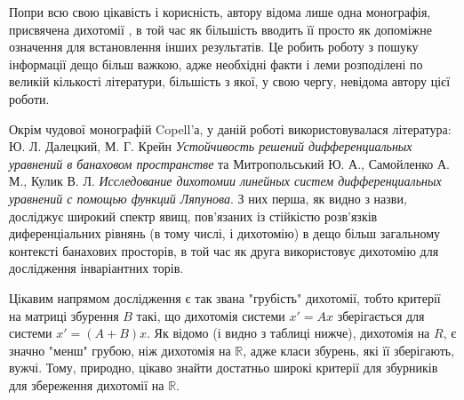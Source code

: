 \documentclass[14pt]{extarticle} %
\theoremstyle{remark}
\begin{document}
Попри всю свою цікавість і корисність, автору відома лише одна монографія, присвячена дихотомії \cite{coppel}, в той час як
більшість вводить її просто як допоміжне
означення для встановлення інших результатів. Це робить роботу з пошуку інформації дещо більш важкою, адже необхідні факти і леми
розподілені по великій кількості літератури, більшість з якої, у свою чергу, невідома автору цієї роботи.

Окрім чудової монографій Copell'а, у
даній роботі використовувалася література: Ю. Л. Далецкий, М. Г. Крейн
\emph{Устойчивость решений дифференциальных уравнений в банаховом пространстве} та Митропольський Ю. А., Самойленко А. М., Кулик В. Л.
\emph{Исследование дихотомии линейных систем дифференциальных уравнений с помощью функций Ляпунова}. З них перша, як видно з назви,
досліджує широкий спектр явищ, пов’язаних із стійкістю розв’язків диференціальних рівнянь (в тому числі, і дихотомію) в дещо
більш загальному контексті банахових просторів, в той час як друга використовує дихотомію для дослідження інваріантних торів.

Цікавим напрямом дослідження є так звана "грубість" дихотомії, тобто критерії на матриці збурення $B$ такі, що дихотомія системи $x'=Ax$ зберігається
для системи $x'=(A+B)x$. Як відомо (і видно з таблиці нижче), дихотомія на $R$, є значно "менш" грубою, ніж дихотомія на $\mathbb{R}$, адже
класи збурень, які її зберігають, вужчі. Тому, природно, цікаво знайти достатньо широкі критерії для збурників для збереження дихотомії на $
\mathbb{R}$.
\end{document}
